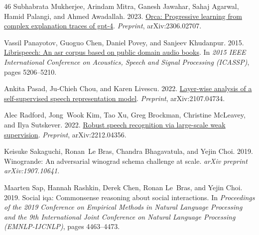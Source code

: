 \documentclass[11pt]{article}
\begin{document}
\begin{thebibliography}{46}
Subhabrata Mukherjee, Arindam Mitra, Ganesh Jawahar, Sahaj Agarwal, Hamid Palangi, and Ahmed Awadallah. 2023.
\newblock \href {https://arxiv.org/abs/2306.02707} {Orca: Progressive learning from complex explanation traces of gpt-4}.
\newblock \emph{Preprint}, arXiv:2306.02707.

Vassil Panayotov, Guoguo Chen, Daniel Povey, and Sanjeev Khudanpur. 2015.
\newblock \href {https://doi.org/10.1109/ICASSP.2015.7178964} {Librispeech: An asr corpus based on public domain audio books}.
\newblock In \emph{2015 IEEE International Conference on Acoustics, Speech and Signal Processing (ICASSP)}, pages 5206--5210.

Ankita Pasad, Ju-Chieh Chou, and Karen Livescu. 2022.
\newblock \href {https://arxiv.org/abs/2107.04734} {Layer-wise analysis of a self-supervised speech representation model}.
\newblock \emph{Preprint}, arXiv:2107.04734.

Alec Radford, Jong~Wook Kim, Tao Xu, Greg Brockman, Christine McLeavey, and Ilya Sutskever. 2022.
\newblock \href {https://arxiv.org/abs/2212.04356} {Robust speech recognition via large-scale weak supervision}.
\newblock \emph{Preprint}, arXiv:2212.04356.

Keisuke Sakaguchi, Ronan~Le Bras, Chandra Bhagavatula, and Yejin Choi. 2019.
\newblock Winogrande: An adversarial winograd schema challenge at scale.
\newblock \emph{arXiv preprint arXiv:1907.10641}.

Maarten Sap, Hannah Rashkin, Derek Chen, Ronan Le~Bras, and Yejin Choi. 2019.
\newblock Social iqa: Commonsense reasoning about social interactions.
\newblock In \emph{Proceedings of the 2019 Conference on Empirical Methods in Natural Language Processing and the 9th International Joint Conference on Natural Language Processing (EMNLP-IJCNLP)}, pages 4463--4473.


\end{thebibliography}
\end{document}
